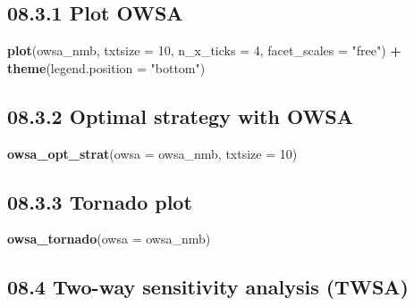 \documentclass[
]{article}
\newenvironment{Shaded}{\begin{snugshade}}{\end{snugshade}}
\newcommand{\DataTypeTok}[1]{\textcolor[rgb]{0.13,0.29,0.53}{#1}}
\newcommand{\DecValTok}[1]{\textcolor[rgb]{0.00,0.00,0.81}{#1}}
\newcommand{\KeywordTok}[1]{\textcolor[rgb]{0.13,0.29,0.53}{\textbf{#1}}}
\newcommand{\NormalTok}[1]{#1}
\newcommand{\OperatorTok}[1]{\textcolor[rgb]{0.81,0.36,0.00}{\textbf{#1}}}
\newcommand{\StringTok}[1]{\textcolor[rgb]{0.31,0.60,0.02}{#1}}
\begin{document}
\hypertarget{plot-owsa}{%
\subsection{08.3.1 Plot OWSA}\label{plot-owsa}}

\begin{Shaded}
\begin{Highlighting}[]
\KeywordTok{plot}\NormalTok{(owsa_nmb, }\DataTypeTok{txtsize =} \DecValTok{10}\NormalTok{, }\DataTypeTok{n_x_ticks =} \DecValTok{4}\NormalTok{, }
     \DataTypeTok{facet_scales =} \StringTok{"free"}\NormalTok{) }\OperatorTok{+}
\StringTok{     }\KeywordTok{theme}\NormalTok{(}\DataTypeTok{legend.position =} \StringTok{"bottom"}\NormalTok{)}
\end{Highlighting}
\end{Shaded}

\hypertarget{optimal-strategy-with-owsa}{%
\subsection{08.3.2 Optimal strategy with
OWSA}\label{optimal-strategy-with-owsa}}

\begin{Shaded}
\begin{Highlighting}[]
\KeywordTok{owsa_opt_strat}\NormalTok{(}\DataTypeTok{owsa =}\NormalTok{ owsa_nmb, }\DataTypeTok{txtsize =} \DecValTok{10}\NormalTok{)}
\end{Highlighting}
\end{Shaded}

\hypertarget{tornado-plot}{%
\subsection{08.3.3 Tornado plot}\label{tornado-plot}}

\begin{Shaded}
\begin{Highlighting}[]
\KeywordTok{owsa_tornado}\NormalTok{(}\DataTypeTok{owsa =}\NormalTok{ owsa_nmb)}
\end{Highlighting}
\end{Shaded}

\hypertarget{two-way-sensitivity-analysis-twsa}{%
\subsection{08.4 Two-way sensitivity analysis
(TWSA)}\label{two-way-sensitivity-analysis-twsa}}
\end{document}
